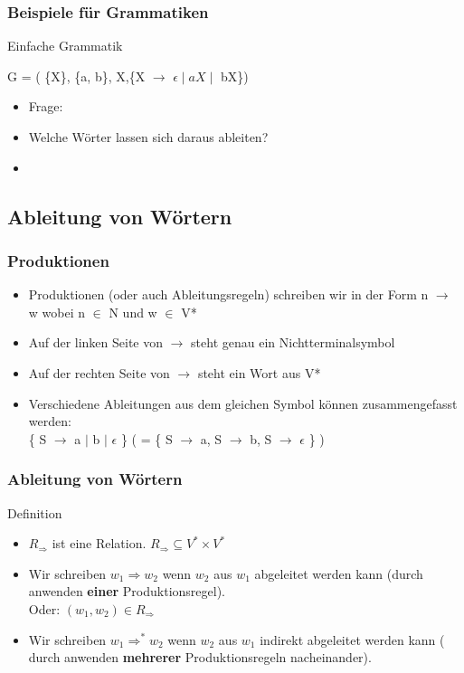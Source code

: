 \documentclass{beamer}
\begin{document}
\begin{frame}
	\frametitle{Beispiele f\"ur Grammatiken}

	\begin{block}{Einfache Grammatik}
		\begin{center}
			G = ( \{X\}, \{a, b\}, X,\{X $\rightarrow$ $\epsilon \mid aX \mid$ bX\})
		\end{center}
		
		\pause
		\begin{itemize}
			\item Frage: \\
			\item Welche W\"orter lassen sich daraus ableiten? \\
			\item {}
		\end{itemize}


	\end{block}
\end{frame}

\subsection{Ableitung von Wörtern}
\begin{frame}
	\frametitle{Produktionen}
	\begin{itemize}
		\item Produktionen (oder auch Ableitungsregeln) schreiben wir in der Form n $\rightarrow$ w wobei n $\in$ N und w 				$\in$ V*
		\item Auf der linken Seite von $\rightarrow$ steht genau ein Nichtterminalsymbol
		\item Auf der rechten Seite von $\rightarrow$ steht ein Wort aus V*
		\item Verschiedene Ableitungen aus dem gleichen Symbol können zusammengefasst werden: \\
		\{ S $\rightarrow$ a $\mid$ b $\mid$ $\epsilon$ \} ( = \{ S $\rightarrow$ a,  S $\rightarrow$ b,  S $\rightarrow$ 					$\epsilon$ \} )
	\end{itemize}
\end{frame}



\begin{frame}
	\frametitle{Ableitung von W\"ortern}

	\begin{block} {Definition }
		\begin{itemize}
			\item $R_\Rightarrow$ ist eine Relation. $R_\Rightarrow \subseteq V^* \times V^*$
			\item Wir schreiben $w_1 \Rightarrow w_2$ wenn $w_2$ aus $w_1$ abgeleitet werden kann (durch anwenden 					\textbf{einer} Produktionsregel). \\
			Oder: $(w_1, w_2) \in R_\Rightarrow$
			\item Wir schreiben $w_1 \Rightarrow^* w_2$ wenn $w_2$ aus $w_1$ indirekt abgeleitet werden kann ( durch 					anwenden \textbf{mehrerer} Produktionsregeln nacheinander).
		\end{itemize}
	\end{block}
\end{frame}
\end{document}
